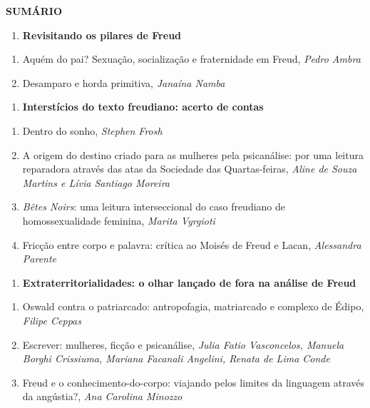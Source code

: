 \textbf{SUMÁRIO}

\begin{enumerate}
\def\labelenumi{\Roman{enumi}.}
\item
  \textbf{Revisitando os pilares de Freud }
\end{enumerate}

\begin{enumerate}
\def\labelenumi{\arabic{enumi}.}
\item
  Aquém do pai? Sexuação, socialização e fraternidade em Freud,
  \emph{Pedro Ambra}
\item
  Desamparo e horda primitiva, \emph{Janaína Namba}
\end{enumerate}

\begin{enumerate}
\def\labelenumi{\Roman{enumi}.}
\item
  \textbf{Interstícios do texto freudiano: acerto de contas}
\end{enumerate}

\begin{enumerate}
\def\labelenumi{\arabic{enumi}.}
\item
  Dentro do sonho, \emph{Stephen Frosh}
\item
  A origem do destino criado para as mulheres pela psicanálise: por uma
  leitura reparadora através das atas da Sociedade das Quartas-feiras,
  \emph{Aline de Souza Martins e Lívia Santiago Moreira}
\item
  \emph{Bêtes Noirs}: uma leitura interseccional do caso freudiano de
  homossexualidade feminina, \emph{Marita Vyrgioti}
\item
  Fricção entre corpo e palavra: crítica ao Moisés de Freud e Lacan,
  \emph{Alessandra Parente}
\end{enumerate}

\begin{enumerate}
\def\labelenumi{\Roman{enumi}.}
\item
  \textbf{Extraterritorialidades: o olhar lançado de fora na análise de
  Freud}
\end{enumerate}

\begin{enumerate}
\def\labelenumi{\arabic{enumi}.}
\item
  Oswald contra o patriarcado: antropofagia, matriarcado e complexo de
  Édipo, \emph{Filipe Ceppas}
\item
  Escrever: mulheres, ficção e psicanálise, \emph{Julia Fatio
  Vasconcelos, Manuela Borghi Crissiuma, Mariana Facanali Angelini,
  Renata de Lima Conde}
\item
  Freud e o conhecimento-do-corpo: viajando pelos limites da linguagem
  através da angústia?, \emph{Ana Carolina Minozzo}
\end{enumerate}

